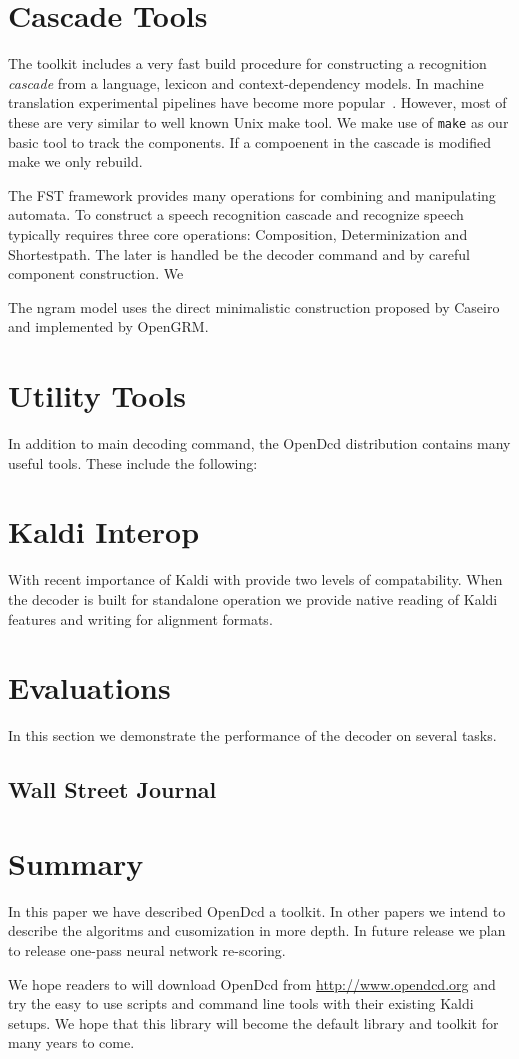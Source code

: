 \documentclass{article}
\begin{document}
\section{Cascade Tools}
\label{sec:cascade}
The toolkit includes a very fast build procedure for constructing a recognition
\emph{cascade} from a language, lexicon and context-dependency models. In 
machine translation experimental pipelines have become more popular~\cite{koehn10}. 
However, most of these are very similar to well known Unix make tool. We make 
use of \texttt{make} as our basic tool to track the components. 
If a compoenent in the cascade is modified make we only rebuild.

The FST framework provides many operations for combining and manipulating
automata. To construct a speech recognition cascade and recognize speech 
typically requires three core operations: Composition, Determinization and
Shortestpath. The later is handled be the decoder command and by careful
component construction. We 

The ngram model uses the direct minimalistic construction proposed by
Caseiro~\cite{caseiro01} and implemented by OpenGRM.

\section{Utility Tools}
\label{sec:postprocess}
In addition to main decoding command, the OpenDcd distribution contains
many useful tools. These include the following:


\section{Kaldi Interop}
With recent importance of Kaldi with provide two levels of compatability.
When the decoder is built for standalone operation we provide native reading
of Kaldi features and writing for alignment formats.


\section{Evaluations}
\label{sec:majhead}
In this section we demonstrate the performance of the decoder on several 
tasks.

\subsection{Wall Street Journal}

\section{Summary}
\label{sec:page}
In this paper we have described OpenDcd a toolkit. In other papers we intend to
describe the algoritms and cusomization in more depth. In future release we
plan to release one-pass neural network re-scoring.

We hope readers to will download OpenDcd from  \url{http://www.opendcd.org} and
try the easy to use scripts and command line tools with their existing Kaldi setups.
We hope that this library will become the default library and toolkit for many 
years to come.



\end{document}
